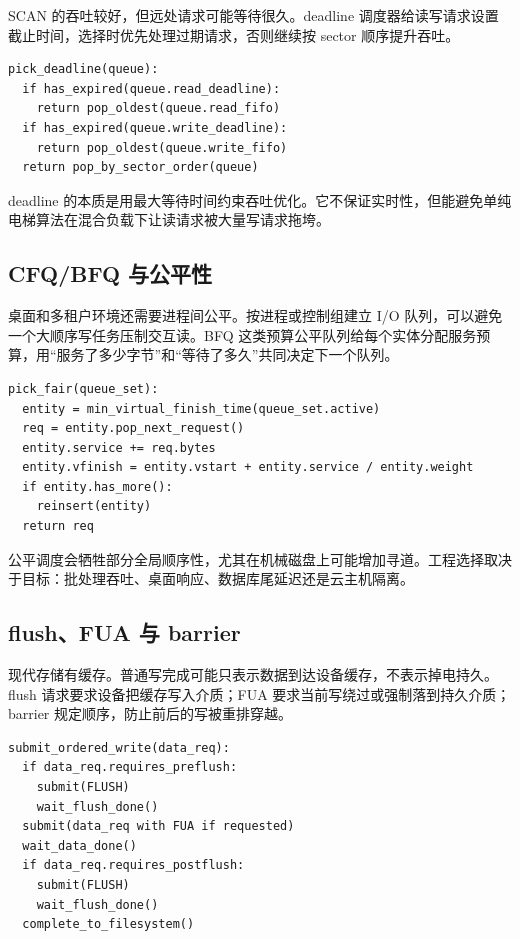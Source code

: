 SCAN 的吞吐较好，但远处请求可能等待很久。deadline 调度器给读写请求设置截止时间，选择时优先处理过期请求，否则继续按 sector 顺序提升吞吐。

\begin{lstlisting}
pick_deadline(queue):
  if has_expired(queue.read_deadline):
    return pop_oldest(queue.read_fifo)
  if has_expired(queue.write_deadline):
    return pop_oldest(queue.write_fifo)
  return pop_by_sector_order(queue)
\end{lstlisting}

deadline 的本质是用最大等待时间约束吞吐优化。它不保证实时性，但能避免单纯电梯算法在混合负载下让读请求被大量写请求拖垮。

\subsection{CFQ/BFQ 与公平性}

桌面和多租户环境还需要进程间公平。按进程或控制组建立 I/O 队列，可以避免一个大顺序写任务压制交互读。BFQ 这类预算公平队列给每个实体分配服务预算，用“服务了多少字节”和“等待了多久”共同决定下一个队列。

\begin{lstlisting}
pick_fair(queue_set):
  entity = min_virtual_finish_time(queue_set.active)
  req = entity.pop_next_request()
  entity.service += req.bytes
  entity.vfinish = entity.vstart + entity.service / entity.weight
  if entity.has_more():
    reinsert(entity)
  return req
\end{lstlisting}

公平调度会牺牲部分全局顺序性，尤其在机械磁盘上可能增加寻道。工程选择取决于目标：批处理吞吐、桌面响应、数据库尾延迟还是云主机隔离。

\subsection{flush、FUA 与 barrier}

现代存储有缓存。普通写完成可能只表示数据到达设备缓存，不表示掉电持久。flush 请求要求设备把缓存写入介质；FUA 要求当前写绕过或强制落到持久介质；barrier 规定顺序，防止前后的写被重排穿越。

\begin{lstlisting}
submit_ordered_write(data_req):
  if data_req.requires_preflush:
    submit(FLUSH)
    wait_flush_done()
  submit(data_req with FUA if requested)
  wait_data_done()
  if data_req.requires_postflush:
    submit(FLUSH)
    wait_flush_done()
  complete_to_filesystem()
\end{lstlisting}

